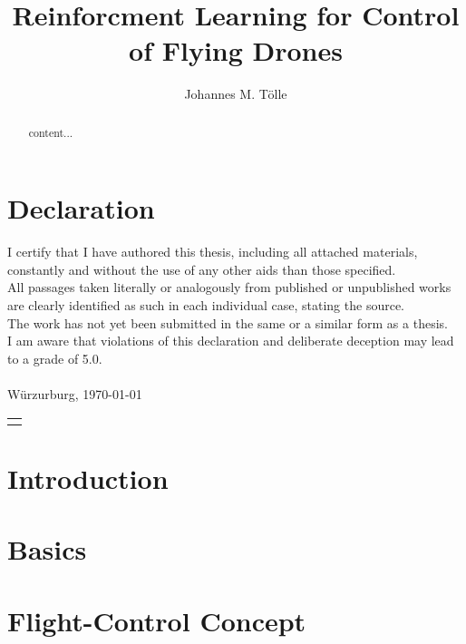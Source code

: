 \documentclass[bachelor,english]{infothesis}
\title{Reinforcment Learning for Control of Flying Drones}
\author{Johannes M. Tölle}
\newenvironment{declaration}
{\chapter*{Declaration}}
{\clearpage}
\begin{document}
	
\begin{declaration}
	I certify that I have authored this thesis, including all attached materials,
	constantly and without the use of any other aids than those specified.\\
	All passages taken literally or analogously from published or unpublished works
	are clearly identified as such in each individual case, stating the source.\\
	The work has not yet been submitted in the same or a similar form as a thesis.\\
	I am aware that violations of this declaration and deliberate deception may lead to
	a grade of 5.0.\\
	\vspace*{12cm}\\
	Würzurburg, \today 
	\hspace*{\fill}\begin{tabular}{@{}l@{}}\hline
	\makebox[4cm]{Johannes M. Tölle}
	\end{tabular}
\end{declaration}

\tableofcontents
\listoffigures
\listoftables
\listofalgorithms

\newpage

\begin{abstract}
	content...
\end{abstract}








\setcounter{page}{1}
\chapter{Introduction}
	

\chapter{Basics}
	

%	
	
\chapter{Flight-Control Concept}
	
\end{document}
